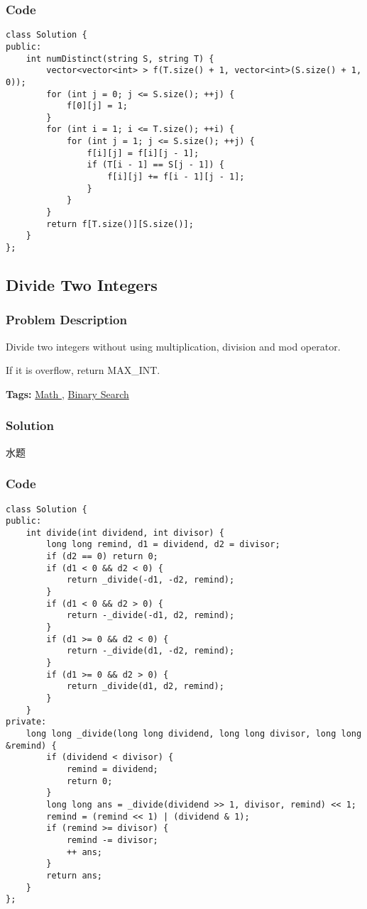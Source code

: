 \documentclass{article}
\begin{document}
\begin{CJK*}{UTF8}{gkai}
\subsubsection*{Code}
\begin{lstlisting}
class Solution {
public:
    int numDistinct(string S, string T) {
        vector<vector<int> > f(T.size() + 1, vector<int>(S.size() + 1, 0));
        for (int j = 0; j <= S.size(); ++j) {
            f[0][j] = 1;
        }
        for (int i = 1; i <= T.size(); ++i) {
            for (int j = 1; j <= S.size(); ++j) {
                f[i][j] = f[i][j - 1];
                if (T[i - 1] == S[j - 1]) {
                    f[i][j] += f[i - 1][j - 1];
                }
            }
        }
        return f[T.size()][S.size()];
    }
}; 
\end{lstlisting}


\subsection{ Divide Two Integers }
\label{ Divide Two Integers }

\subsubsection*{Problem Description}
Divide two integers without using multiplication, division and mod operator.

If it is overflow, return MAX\_INT.


\textbf{Tags: }
\hyperref[ Math ]{ Math },  \hyperref[ Binary Search ]{ Binary Search }



\subsubsection*{Solution}
水题

\subsubsection*{Code}
\begin{lstlisting}
class Solution {
public:
    int divide(int dividend, int divisor) {
        long long remind, d1 = dividend, d2 = divisor;
        if (d2 == 0) return 0;
        if (d1 < 0 && d2 < 0) {
            return _divide(-d1, -d2, remind);
        }
        if (d1 < 0 && d2 > 0) {
            return -_divide(-d1, d2, remind);
        }
        if (d1 >= 0 && d2 < 0) {
            return -_divide(d1, -d2, remind);
        }
        if (d1 >= 0 && d2 > 0) {
            return _divide(d1, d2, remind);
        }
    }
private:
    long long _divide(long long dividend, long long divisor, long long &remind) {
        if (dividend < divisor) {
            remind = dividend;
            return 0;
        }
        long long ans = _divide(dividend >> 1, divisor, remind) << 1;
        remind = (remind << 1) | (dividend & 1);
        if (remind >= divisor) {
            remind -= divisor;
            ++ ans;
        }
        return ans;
    }
}; 
\end{lstlisting}



\end{CJK*}
\end{document}
